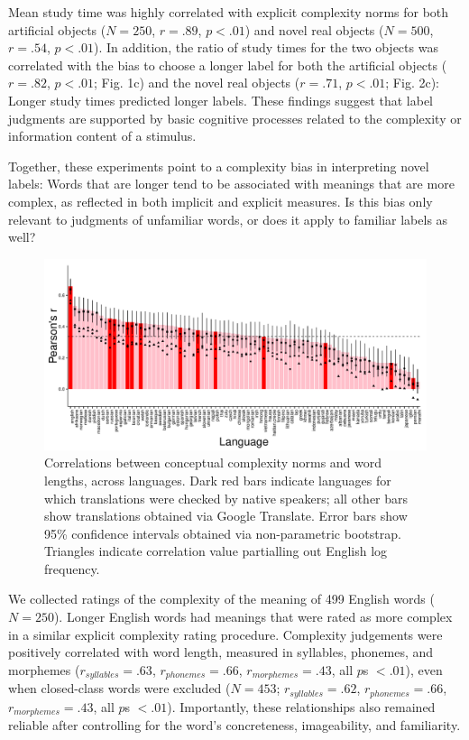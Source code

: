 \documentclass[12pt]{article}
\begin{document}
Mean study time was highly correlated with explicit complexity norms for both artificial objects ($N = 250$, $r = .89$, $p < .01$) and novel real objects ($N = 500$, $r = .54$, $p < .01$). In addition, the ratio of study times for the two objects was correlated with the bias to choose a longer label for both the artificial objects ($r = .82$, $p < .01$; Fig. 1c) and the novel real objects ($r = .71$, $p < .01$; Fig. 2c): Longer study times predicted longer labels. These findings suggest that label judgments are supported by basic cognitive processes related to the complexity or information content of a stimulus. 
					
Together, these experiments point to a complexity bias in interpreting novel labels: Words that are longer tend to be associated with meanings that are more complex, as reflected in both implicit and explicit measures. Is this bias only relevant to judgments of unfamiliar words, or does it apply to familiar labels as well? 


\begin{figure}[t]
\begin{center}
\includegraphics[scale = .55]{figs/xling.pdf}
\caption{Correlations between conceptual complexity norms and word lengths, across languages. Dark red bars indicate languages for which translations were checked by native speakers; all other bars show translations obtained via Google Translate. Error bars show 95\% confidence intervals obtained via non-parametric bootstrap. Triangles indicate correlation value partialling out English log frequency.}
\end{center}
\label{fig:real_objs}
\end{figure}

We collected ratings of the complexity of the meaning of 499 English words ($N = 250$). Longer English words had meanings that were rated as more complex in a similar explicit complexity rating procedure. Complexity judgements were positively correlated with word length, measured in syllables, phonemes, and morphemes ($r_{syllables} = .63$, $r_{phonemes} = .66$, $r_{morphemes} = .43$, all $p$s $< .01$), even when closed-class words were excluded ($N = 453$; $r_{syllables} = .62$, $r_{phonemes} = .66$, $r_{morphemes} = .43$, all $p$s $< .01$). Importantly, these relationships also remained reliable after controlling for the word's concreteness, imageability, and familiarity. 
						
\end{document}
